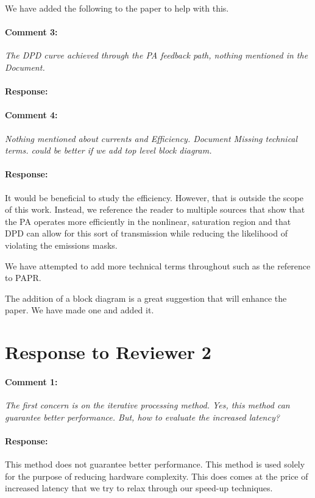 \documentclass[]{article}
\begin{document}
We have added the following to the paper to help with this.
	
\paragraph{Comment 3:}\textit{The DPD curve achieved through the PA feedback path, nothing mentioned in the Document.}
\paragraph{Response:}
	
\paragraph{Comment 4:}\textit{Nothing mentioned about currents and Efficiency. Document Missing technical terms. could be better if we add top level block diagram.
}
\paragraph{Response:}
It would be beneficial to study the efficiency. However, that is outside the scope of this work. Instead, we reference the reader to multiple sources that show that the PA operates more efficiently in the nonlinear, saturation region and that DPD can allow for this sort of transmission while reducing the likelihood of violating the emissions masks. 

We have attempted to add more technical terms throughout such as the reference to PAPR. 

The addition of a block diagram is a great suggestion that will enhance the paper. We have made one and added it.


\section{Response to Reviewer 2}
\paragraph{Comment 1:}\textit{The first concern is on the iterative processing method. Yes, this method can guarantee better performance. But, how to evaluate the increased latency?}
\paragraph{Response:}
This method does not guarantee better performance. This method is used solely for the purpose of reducing hardware complexity. This does comes at the price of increased latency that we try to relax through our speed-up techniques. 
\end{document}
